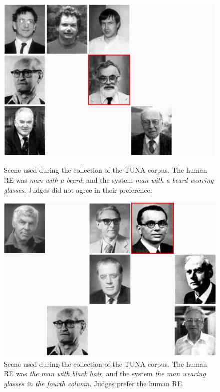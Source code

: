 \begin{figure}[h]
\begin{minipage}{0.50\linewidth}
\centering
\includegraphics[width=\textwidth]{images/s315t21.jpg}
\caption{Scene used during the collection of the TUNA corpus. The human RE was \emph{man with a beard}, and the system \emph{man with a beard wearing glasses}. Judges did not agree in their preference.}
\label{s307t21}
\end{minipage}
\begin{minipage}{0.50\linewidth}
\centering
\includegraphics[width=\textwidth]{images/s59t26.jpg}
\caption{Scene used during the collection of the TUNA corpus. The human  RE was \emph{the man with black hair}, and the system \emph{the man wearing glasses in the fourth column}. Judges prefer the human RE.}
\label{s28t25}
\end{minipage}
\end{figure}

